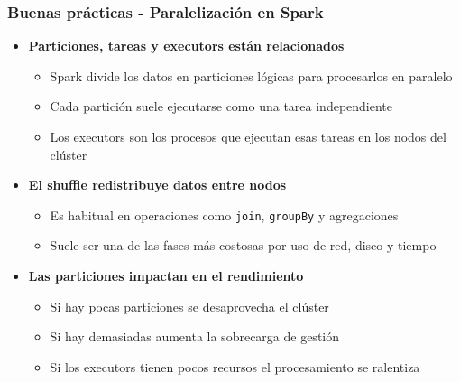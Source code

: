 \documentclass[aspectratio=169]{beamer}
\begin{document}

\begin{frame}\frametitle{Buenas prácticas - Paralelización en Spark}
\begin{itemize}
  \item \textbf{Particiones, tareas y executors están relacionados}
  \begin{itemize}
    \item Spark divide los datos en particiones lógicas para procesarlos en paralelo
    \item Cada partición suele ejecutarse como una tarea independiente
    \item Los executors son los procesos que ejecutan esas tareas en los nodos del clúster
  \end{itemize}

  \vspace{0.8em}

  \item \textbf{El shuffle redistribuye datos entre nodos}
  \begin{itemize}
    \item Es habitual en operaciones como \texttt{join}, \texttt{groupBy} y agregaciones
    \item Suele ser una de las fases más costosas por uso de red, disco y tiempo
  \end{itemize}

  \vspace{0.8em}

  \item \textbf{Las particiones impactan en el rendimiento}
  \begin{itemize}
    \item Si hay pocas particiones se desaprovecha el clúster
    \item Si hay demasiadas aumenta la sobrecarga de gestión
    \item Si los executors tienen pocos recursos el procesamiento se ralentiza
  \end{itemize}
\end{itemize}
\end{frame}
\end{document}
